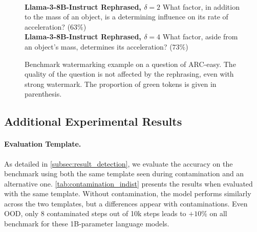 \begin{figure}[b!]
\begin{tcolorbox}[colframe=metablue, colback=white]
\begin{minipage}{0.48\textwidth}
            \\[4pt]
            \textbf{Llama-3-8B-Instruct Rephrased, $\delta=2$}\newline
            What factor, in addition to the mass of an object, is a determining influence on its rate of acceleration? ($63\%$)
            \\[4pt]
            \textbf{Llama-3-8B-Instruct Rephrased, $\delta=4$}\newline
            What factor, aside from an object's mass, determines its acceleration? ($73\%$)
        \end{minipage}
    \end{tcolorbox}
    \caption{
        Benchmark watermarking example on a question of ARC-easy. 
        The quality of the question is not affected by the rephrasing, even with strong watermark. 
        The proportion of green tokens is given in parenthesis. 
    }
    \label{fig:example_answers_big}
\end{figure}


\subsection{Additional Experimental Results}

\paragraph{\textbf{Evaluation Template.}} As detailed in \autoref{subsec:result_detection}, we evaluate the accuracy on the benchmark using both the same template seen during contamination and an alternative one. \autoref{tab:contamination_indist} presents the results when evaluated with the same template.
Without contamination, the model performs similarly across the two templates, but a differences appear with contaminations.
Even OOD, only 8 contaminated steps out of 10k steps leads to $+10\%$ on all benchmark for these 1B-parameter language models.

